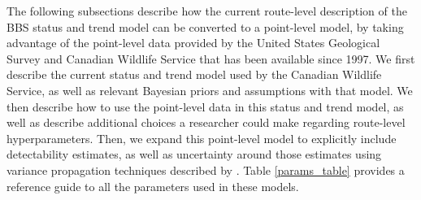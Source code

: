 \par The following subsections describe how the current route-level description of the BBS status and trend model can be converted to a point-level model, by taking advantage of the point-level data provided by the United States Geological Survey and Canadian Wildlife Service that has been available since 1997. 
We first describe the current status and trend model used by the Canadian Wildlife Service, as well as relevant Bayesian priors and assumptions with that model.
We then describe how to use the point-level data in this status and trend model, as well as describe additional choices a researcher could make regarding route-level hyperparameters.
Then, we expand this point-level model to explicitly include detectability estimates, as well as uncertainty around those estimates using variance propagation techniques described by \citep{bravington_variance_2021}.
Table \ref{params_table} provides a reference guide to all the parameters used in these models.

